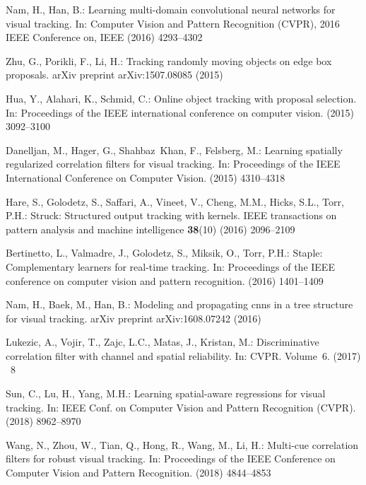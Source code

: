 \documentclass[runningheads]{llncs}
\begin{document}
\begin{thebibliography}{10}
Nam, H., Han, B.:
\newblock Learning multi-domain convolutional neural networks for visual
  tracking.
\newblock In: Computer Vision and Pattern Recognition (CVPR), 2016 IEEE
  Conference on, IEEE (2016)  4293--4302

Zhu, G., Porikli, F., Li, H.:
\newblock Tracking randomly moving objects on edge box proposals.
\newblock arXiv preprint arXiv:1507.08085 (2015)

Hua, Y., Alahari, K., Schmid, C.:
\newblock Online object tracking with proposal selection.
\newblock In: Proceedings of the IEEE international conference on computer
  vision. (2015)  3092--3100

Danelljan, M., Hager, G., Shahbaz~Khan, F., Felsberg, M.:
\newblock Learning spatially regularized correlation filters for visual
  tracking.
\newblock In: Proceedings of the IEEE International Conference on Computer
  Vision. (2015)  4310--4318

Hare, S., Golodetz, S., Saffari, A., Vineet, V., Cheng, M.M., Hicks, S.L.,
  Torr, P.H.:
\newblock Struck: Structured output tracking with kernels.
\newblock IEEE transactions on pattern analysis and machine intelligence
  \textbf{38}(10) (2016)  2096--2109

Bertinetto, L., Valmadre, J., Golodetz, S., Miksik, O., Torr, P.H.:
\newblock Staple: Complementary learners for real-time tracking.
\newblock In: Proceedings of the IEEE conference on computer vision and pattern
  recognition. (2016)  1401--1409

Nam, H., Baek, M., Han, B.:
\newblock Modeling and propagating cnns in a tree structure for visual
  tracking.
\newblock arXiv preprint arXiv:1608.07242 (2016)

Lukezic, A., Vojir, T., Zajc, L.C., Matas, J., Kristan, M.:
\newblock Discriminative correlation filter with channel and spatial
  reliability.
\newblock In: CVPR. Volume~6. (2017) ~8

Sun, C., Lu, H., Yang, M.H.:
\newblock Learning spatial-aware regressions for visual tracking.
\newblock In: IEEE Conf. on Computer Vision and Pattern Recognition (CVPR).
  (2018)  8962--8970

Wang, N., Zhou, W., Tian, Q., Hong, R., Wang, M., Li, H.:
\newblock Multi-cue correlation filters for robust visual tracking.
\newblock In: Proceedings of the IEEE Conference on Computer Vision and Pattern
  Recognition. (2018)  4844--4853


\end{thebibliography}
\end{document}
